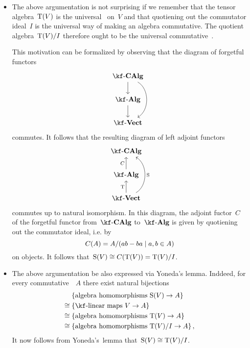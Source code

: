 \begin{recall}
\begin{description}
\begin{itemize}
				\item
					The above argumentation is not surprising if we remember that the tensor algebra~$\operatorname{T}(V)$ is the universal~{\algebra{$\kf$}} on~$V$ and that quotiening out the commutator ideal~$I$ is the universal way of making an algebra commutative.
					The quotient algebra~$\operatorname{T}(V)/I$ therefore ought to be the universal commutative~{\algebra{$\kf$}}.
					
					This motivation can be formalized by observing that the diagram of forgetful functors
					\[
						\begin{tikzcd}
							\cCAlg{\kf}
							\arrow{d}
							\arrow[bend left = 60]{dd}
							\\
							\cAlg{\kf}
							\arrow{d}
							\\
							\cVect{\kf}
						\end{tikzcd}
					\]
					commutes.
					It follows that the resulting diagram of left adjoint functors
					\[
						\begin{tikzcd}
							\cCAlg{\kf}
							\\
							\cAlg{\kf}
							\arrow{u}[left]{C}
							\\
							\cVect{\kf}
							\arrow{u}[left]{\Tensor}
							\arrow[bend right = 60]{uu}[right]{\Symm}
						\end{tikzcd}
					\]
					commutes up to natural isomorphism.
					In this diagram, the adjoint fuctor~$C$ of the forgetful functor from~$\cCAlg{\kf}$ to~$\cAlg{\kf}$ is given by quotiening out the commutator ideal, i.e. by
					\[
						C(A)
						=
						A / \ideal{ ab - ba \suchthat a, b \in A }
					\]
					on objects.
					It follows that~$\operatorname{S}(V) \cong C(\operatorname{T}(V)) = \operatorname{T}(V)/I$.
				\item
					The above argumentation be also expressed via Yoneda’s lemma.
					Inddeed, for every commutative~\algebra{$\kf$}~$A$ there exist natural bijections
					\begin{align*}
						{}&
						\{ \textstyle\text{algebra homomorphisms~$\Symm(V) \to A$} \}
						\\
						\cong{}&
						\{ \textstyle\text{{\linear{$\kf$}} maps~$V \to A$} \}
						\\
						\cong{}&
						\{ \textstyle\text{algebra homomorphisms~$\Tensor(V) \to A$} \}
						\\
						\cong{}&
						\{ \textstyle\text{algebra homomorphisms~$\Tensor(V)/I \to A$} \} \,,
					\end{align*}
					It now follows from Yoneda’s~lemma that~$\operatorname{S}(V) \cong \operatorname{T}(V)/I$.
			\end{itemize}
	\end{description}
\end{recall}


